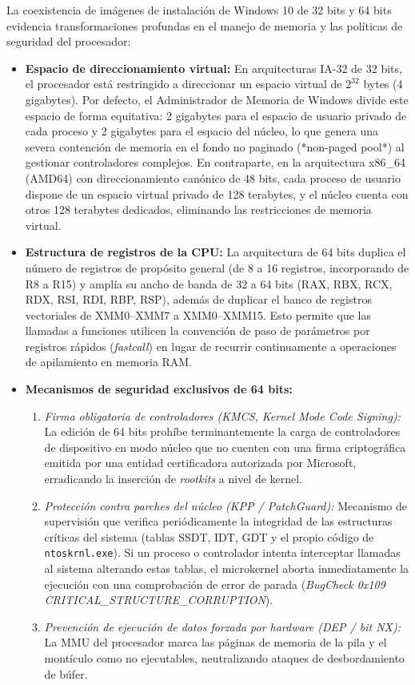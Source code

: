 \documentclass[12pt]{article}
\begin{document}
La coexistencia de imágenes de instalación de Windows 10 de 32 bits y 64 bits evidencia transformaciones profundas en el manejo de memoria y las políticas de seguridad del procesador:
\begin{itemize}[noitemsep, topsep=2pt]
    \item \textbf{Espacio de direccionamiento virtual:} En arquitecturas IA-32 de 32 bits, el procesador está restringido a direccionar un espacio virtual de $2^{32}$ bytes (4 gigabytes). Por defecto, el Administrador de Memoria de Windows divide este espacio de forma equitativa: 2 gigabytes para el espacio de usuario privado de cada proceso y 2 gigabytes para el espacio del núcleo, lo que genera una severa contención de memoria en el fondo no paginado (*non-paged pool*) al gestionar controladores complejos. En contraparte, en la arquitectura x86\_64 (AMD64) con direccionamiento canónico de 48 bits, cada proceso de usuario dispone de un espacio virtual privado de 128 terabytes, y el núcleo cuenta con otros 128 terabytes dedicados, eliminando las restricciones de memoria virtual.
    \item \textbf{Estructura de registros de la CPU:} La arquitectura de 64 bits duplica el número de registros de propósito general (de 8 a 16 registros, incorporando de R8 a R15) y amplía su ancho de banda de 32 a 64 bits (RAX, RBX, RCX, RDX, RSI, RDI, RBP, RSP), además de duplicar el banco de registros vectoriales de XMM0--XMM7 a XMM0--XMM15. Esto permite que las llamadas a funciones utilicen la convención de paso de parámetros por registros rápidos (\textit{fastcall}) en lugar de recurrir continuamente a operaciones de apilamiento en memoria RAM.
    \item \textbf{Mecanismos de seguridad exclusivos de 64 bits:}
    \begin{enumerate}[noitemsep, topsep=1pt]
        \item \textit{Firma obligatoria de controladores (KMCS, Kernel Mode Code Signing):} La edición de 64 bits prohíbe terminantemente la carga de controladores de dispositivo en modo núcleo que no cuenten con una firma criptográfica emitida por una entidad certificadora autorizada por Microsoft, erradicando la inserción de \textit{rootkits} a nivel de kernel.
        \item \textit{Protección contra parches del núcleo (KPP / PatchGuard):} Mecanismo de supervisión que verifica periódicamente la integridad de las estructuras críticas del sistema (tablas SSDT, IDT, GDT y el propio código de \texttt{ntoskrnl.exe}). Si un proceso o controlador intenta interceptar llamadas al sistema alterando estas tablas, el microkernel aborta inmediatamente la ejecución con una comprobación de error de parada (\textit{BugCheck 0x109 CRITICAL\_STRUCTURE\_CORRUPTION}).
        \item \textit{Prevención de ejecución de datos forzada por hardware (DEP / bit NX):} La MMU del procesador marca las páginas de memoria de la pila y el montículo como no ejecutables, neutralizando ataques de desbordamiento de búfer.
    \end{enumerate}
\end{itemize}
\end{document}
